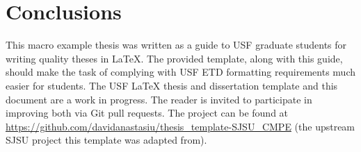\section{Conclusions}\label{sec:conclusions}
This macro example thesis was written as a guide to USF graduate students for writing quality theses in LaTeX. The provided template, along with this guide, should make the task of complying with USF ETD formatting requirements much easier for students. The USF LaTeX thesis and dissertation template and this document are a work in progress. The reader is invited to participate in improving both via Git pull requests. The project can be found at \url{https://github.com/davidanastasiu/thesis_template-SJSU_CMPE} (the upstream SJSU project this template was adapted from).

